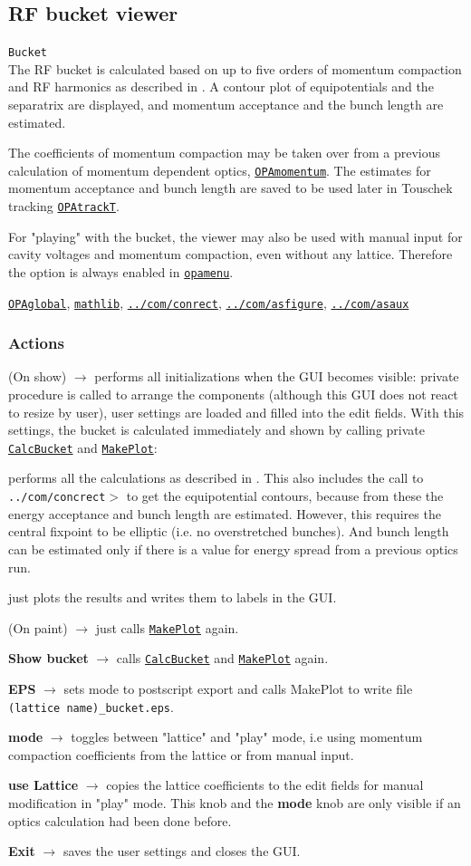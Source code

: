 \documentclass[12pt]{article}
\newcommand\code[1]{{\tt #1}}
\newcommand{\ofld}[1]{\colorbox{black!15}{{\bf #1}}}
\newcommand{\ofldx}[1]{\colorbox{black!15}{(#1)}}
\newcommand\guico[1]{{\color{blue}\code{#1}}}
\newcommand{\unico}[1]{{\color{burntorange}\code{#1}}}
\newcommand{\evcod}[2]{\ofld{#1} $\rightarrow$ \guico{#2}}
\newcommand{\evcodx}[2]{\ofldx{#1} $\rightarrow$ \guico{#2}}
\newcommand{\prcod}[2]{\opauni{#1}$>$\unico{#2}}
\newcommand{\opagui}[1]{\colorbox{blue!20}{\code{#1}}}
\newcommand{\oguih}[2]{\subsection{\label{#2}#1}{\Huge\opagui{#2}}\\}
\newcommand{\ogui}[1]{\hyperref[#1]{\opagui{#1}}}
\newcommand{\opaguif}[1]{\colorbox{violet!30}{\code{#1}}}
\newcommand{\oguif}[1]{\hyperref[#1]{\opaguif{#1}}}
\newcommand{\opauni}[1]{\colorbox{orange!30}{\code{#1}}}
\newcommand{\ouni}[1]{\hyperref[#1]{\opauni{#1}}}
\newcommand{\uses}[1]{\flushleft {\bf Uses:} #1}
\newcommand{\desc}[1]{#1}
\newcommand{\act}[1]{\subsubsection*{Actions} #1}
\begin{document}
\oguih{RF bucket viewer}{Bucket}

\desc{
The RF bucket is calculated based on up to five orders of momentum compaction and RF harmonics as described in \cite{inside}. A contour plot of equipotentials and the separatrix are displayed, and momentum acceptance and the bunch length are estimated.

The coefficients of momentum compaction may be taken over from a previous calculation of momentum dependent optics, \ogui{OPAmomentum}. The estimates for momentum acceptance and bunch length are saved to be used later in Touschek tracking \ogui{OPAtrackT}.

For "playing" with the bucket, the viewer may also be used with manual input for cavity voltages and momentum compaction, even without any lattice. Therefore the option is always enabled in \ogui{opamenu}.
}

\uses{\ouni{OPAglobal}, \ouni{mathlib}, \ouni{../com/conrect}, \oguif{../com/asfigure}, \ouni{../com/asaux}} 

\act{
\evcodx{On show}{FormShow} performs all initializations when the GUI becomes visible:  private procedure \guico{Layout} is called to arrange the components (although this GUI does not react to resize by user), user settings are loaded and filled into the edit fields. With this settings, the bucket is calculated immediately and shown by calling private \ogui{CalcBucket} and \ogui{MakePlot}:

\guico{CalcBucket} performs all the calculations as described in \cite{inside}. This also includes the call to \prcod{../com/concrect}{conrec} to get the equipotential contours, because from these the energy acceptance and bunch length are estimated. However, this requires the central fixpoint to be elliptic (i.e. no overstretched bunches). And bunch length can be estimated only if there is a value for energy spread from a previous optics run.

\guico{MakePlot} just plots the results and writes them to labels in the GUI.


\evcodx{On paint}{FormPaint} just calls \ogui{MakePlot} again.

\evcod{Show bucket}{butconClick} calls \ogui{CalcBucket} and \ogui{MakePlot} again.

\evcod{EPS}{butepsClick} sets mode to postscript export and calls {MakePlot} to write file \code{(lattice name)\_bucket.eps}.

\evcod{mode}{butmodClick} toggles between "lattice" and "play" mode, i.e using momentum compaction coefficients from the lattice or from manual input. 

\evcod{use Lattice}{butcopyClick} copies the lattice coefficients to the edit fields for manual modification in "play" mode. This knob and the \ofld{mode} knob are only visible if an optics calculation had been done before.

\evcod{Exit}{butexClick} saves the user settings and closes the GUI.
}
\end{document}
